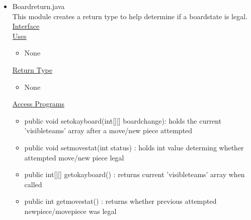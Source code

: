 \documentclass[12pt]{article}
\begin{document}
\begin{itemize}
\begin{itemize}
\end{itemize}
\item Boardreturn.java \\
This module creates a return type to help determine if a boardstate is legal. \\
\underline{Interface} \\
\underline{Uses}
\begin{itemize}
	\item None
\end{itemize} 
\underline{Return Type}
\begin{itemize}
	\item None
\end{itemize}
\underline{Access Programs}
\begin{itemize}
	\item public void setokayboard(int[][] boardchange): holds the current 'visibleteams' array after a move/new piece attempted 
	\item public void setmovestat(int status) : holds int value determing whether attempted move/new piece legal
	\item public int[][] getokayboard() : returns current 'visibleteams' array when called
	\item public int getmovestat() : returns whether previous attempted newpiece/movepiece was legal
	
\end{itemize}
	\end{itemize}
		
\end{document}
